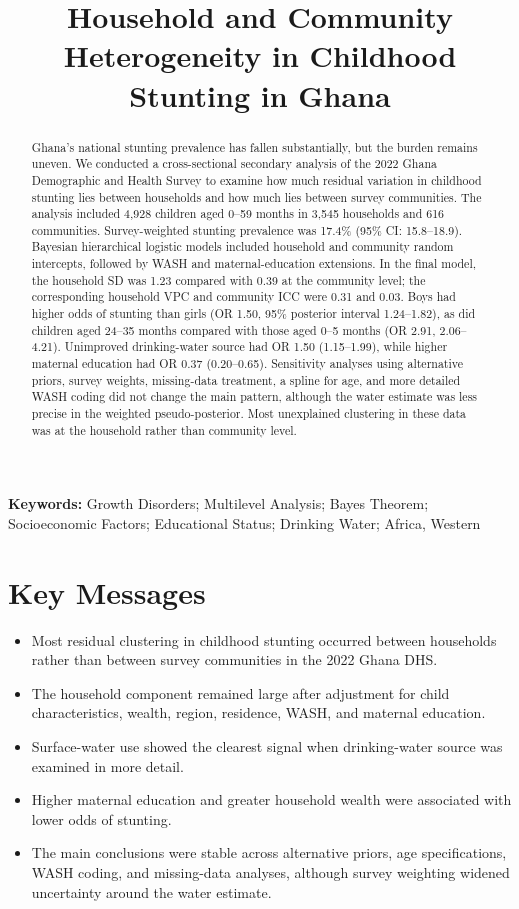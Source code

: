 \documentclass[11pt]{article}
\title{Household and Community Heterogeneity in Childhood Stunting in Ghana}
\author{}
\date{}
\begin{document}
\maketitle

\begin{abstract}
Ghana's national stunting prevalence has fallen substantially, but the burden remains uneven. We conducted a cross-sectional secondary analysis of the 2022 Ghana Demographic and Health Survey to examine how much residual variation in childhood stunting lies between households and how much lies between survey communities. The analysis included 4,928 children aged 0--59 months in 3,545 households and 616 communities. Survey-weighted stunting prevalence was 17.4\% (95\% CI: 15.8--18.9). Bayesian hierarchical logistic models included household and community random intercepts, followed by WASH and maternal-education extensions. In the final model, the household SD was 1.23 compared with 0.39 at the community level; the corresponding household VPC and community ICC were 0.31 and 0.03. Boys had higher odds of stunting than girls (OR 1.50, 95\% posterior interval 1.24--1.82), as did children aged 24--35 months compared with those aged 0--5 months (OR 2.91, 2.06--4.21). Unimproved drinking-water source had OR 1.50 (1.15--1.99), while higher maternal education had OR 0.37 (0.20--0.65). Sensitivity analyses using alternative priors, survey weights, missing-data treatment, a spline for age, and more detailed WASH coding did not change the main pattern, although the water estimate was less precise in the weighted pseudo-posterior. Most unexplained clustering in these data was at the household rather than community level.
\end{abstract}

\noindent\textbf{Keywords:} Growth Disorders; Multilevel Analysis; Bayes Theorem; Socioeconomic Factors; Educational Status; Drinking Water; Africa, Western

\section*{Key Messages}
\begin{itemize}
\item Most residual clustering in childhood stunting occurred between households rather than between survey communities in the 2022 Ghana DHS.
\item The household component remained large after adjustment for child characteristics, wealth, region, residence, WASH, and maternal education.
\item Surface-water use showed the clearest signal when drinking-water source was examined in more detail.
\item Higher maternal education and greater household wealth were associated with lower odds of stunting.
\item The main conclusions were stable across alternative priors, age specifications, WASH coding, and missing-data analyses, although survey weighting widened uncertainty around the water estimate.
\end{itemize}
\end{document}
